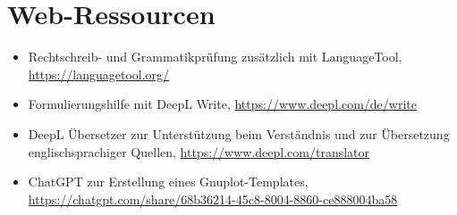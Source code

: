 \documentclass[paper=a4,fontsize=12pt,ngerman]{scrartcl}
\begin{document}
\section{Web-Ressourcen}
\begin{itemize}
  \item Rechtschreib- und Grammatikprüfung zusätzlich mit LanguageTool, \url{https://languagetool.org/}
  \item Formulierungshilfe mit DeepL Write, \url{https://www.deepl.com/de/write}
  \item DeepL Übersetzer zur Unterstützung beim Verständnis und zur Übersetzung englischsprachiger Quellen, \url{https://www.deepl.com/translator}
  \item ChatGPT zur Erstellung eines Gnuplot-Templates, \url{https://chatgpt.com/share/68b36214-45c8-8004-8860-ce888004ba58}
\end{itemize}
\end{document}
